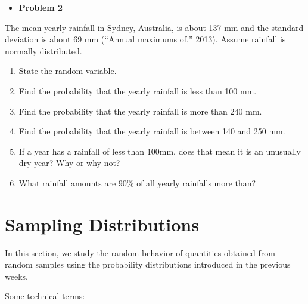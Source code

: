 \documentclass[
]{book}
\providecommand{\tightlist}{%
  \setlength{\itemsep}{0pt}\setlength{\parskip}{0pt}}
\begin{document}
\begin{itemize}
\tightlist
\item
  \textbf{Problem 2}
\end{itemize}

The mean yearly rainfall in Sydney, Australia, is about 137 mm and the standard deviation is about 69 mm (``Annual maximums of,'' 2013). Assume rainfall is normally distributed.

\begin{enumerate}
\def\labelenumi{\arabic{enumi}.}
\tightlist
\item
  State the random variable.
\item
  Find the probability that the yearly rainfall is less than 100 mm.
\item
  Find the probability that the yearly rainfall is more than 240 mm.
\item
  Find the probability that the yearly rainfall is between 140 and 250 mm.
\item
  If a year has a rainfall of less than 100mm, does that mean it is an unusually dry year? Why or why not?
\item
  What rainfall amounts are 90\% of all yearly rainfalls more than?
\end{enumerate}

\hypertarget{sampling-distributions}{%
\chapter{Sampling Distributions}\label{sampling-distributions}}

In this section, we study the random behavior of quantities obtained from random samples using the probability distributions introduced in the previous weeks.

Some technical terms:
\end{document}
